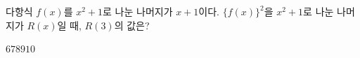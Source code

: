 다항식 $f(x)$를 $x^2+1$로 나눈 나머지가 $x+1$이다. $\{f(x)\}^2$을 $x^2+1$로 나눈 나머지가 $R(x)$일 때, $R(3)$의 값은?
\begin{choices32}{$6$}{$7$}{$8$}{$9$}{$10$}\end{choices32}
